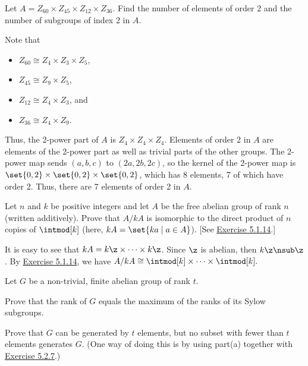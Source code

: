 \begin{exercise}\label{ex5.2.9}
    Let $A = Z_{60} \times Z_{45} \times Z_{12} \times Z_{36}$. Find the number of elements of order 2 and the number of subgroups of index 2 in $A$.
\end{exercise}

\begin{sol}
    Note that
    \begin{itemize}
        \item $Z_{60} \cong Z_4 \times Z_3 \times Z_5$,
        \item $Z_{45} \cong Z_9 \times Z_5$,
        \item $Z_{12} \cong Z_4 \times Z_3$, and
        \item $Z_{36} \cong Z_4 \times Z_9$.
    \end{itemize}
    Thus, the 2-power part of $A$ is $Z_4 \times Z_4 \times Z_4$. Elements of order 2 in $A$ are elements of the 2-power part as well as trivial parts of the other groups. The 2-power map sends $(a, b, c)$ to $(2a, 2b, 2c)$, so the kernel of the 2-power map is $\set{0, 2} \times \set{0, 2} \times \set{0, 2}$, which has 8 elements, 7 of which have order 2. Thus, there are 7 elements of order 2 in $A$.
\end{sol}

\begin{exercise}\label{ex5.2.10}
    Let $n$ and $k$ be positive integers and let $A$ be the free abelian group of rank $n$ (written additively). Prove that $A/kA$ is isomorphic to the direct product of $n$ copies of $\intmod[k]$ (here, $kA = \set{ka \mid a \in A}$). [See \hyperref[ex5.1.14]{Exercise 5.1.14}.]
\end{exercise}

\begin{sol}
    It is easy to see that $kA = k\z \times \cdots \times k\z$. Since $\z$ is abelian, then $k\z \nsub \z$. By \hyperref[ex5.1.14]{Exercise 5.1.14}, we have $A/kA \cong \intmod[k] \times \cdots \times \intmod[k].$
\end{sol}

\newpage

\begin{exercise}\label{ex5.2.11}
    Let $G$ be a non-trivial, finite abelian group of rank $t$.
    \begin{subproblems}
        \item Prove that the rank of $G$ equals the maximum of the ranks of its Sylow subgroups.
        \item Prove that $G$ can be generated by $t$ elements, but no subset with fewer than $t$ elements generates $G$. (One way of doing this is by using part(a) together with \hyperref[ex5.2.7]{Exercise 5.2.7}.)
    \end{subproblems}
\end{exercise}

